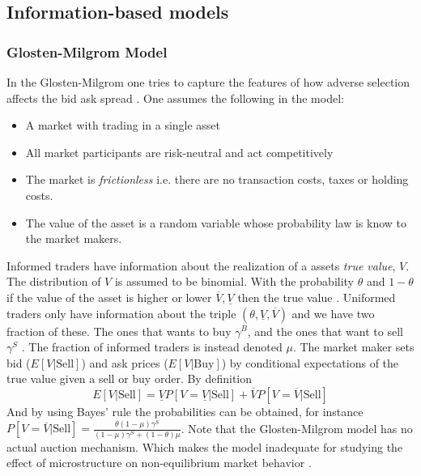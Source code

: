 \documentclass{kththesis}
\theoremstyle{definition}
\begin{document}
\subsection{Information-based models}

\subsubsection*{Glosten-Milgrom Model}
In the Glosten-Milgrom one tries to capture the features of how adverse selection affects the bid ask spread \parencite{darley2007nasdaq}. One assumes the following in the model:
\begin{itemize}
    \item A market with trading in a single asset
    \item All market participants are risk-neutral and act competitively
    \item The market is \textit{frictionless} i.e. there are no transaction costs, taxes or holding costs.
    \item The value of the asset is a random variable whose probability law is know to the market makers.
\end{itemize}
Informed traders have information about the realization of a assets \textit{true value}, $V$. The distribution of $V$ is assumed to be binomial. With the probability $\theta$ and $1- \theta$ if the value of the asset is higher or lower $\overline{V}, \underline{V}$  then the true value \parencite{darley2007nasdaq}. Uniformed traders only have information about the triple $(\theta, \underline{V}, \overline{V})$ and we have two fraction of these. The ones that wants to buy $\gamma^{B}$, and the ones that want to sell $\gamma^{S}$ \parencite{darley2007nasdaq}. The fraction of informed traders is instead denoted $\mu$. The market maker sets bid ($E[V|\text{Sell}]$) and ask prices ($E[V|\text{Buy}]$) by conditional expectations of the true value given a sell or buy order. By definition \parencite{darley2007nasdaq} 
\begin{equation}
    \label{eq:7}
    E[V|\text{Sell}] = \underline{V}P[V=\underline{V}|\text{Sell}] + \overline{V}P[V=\overline{V}|\text{Sell}]
\end{equation}
And by using Bayes' rule the probabilities  can be obtained, for instance $P[V=\overline{V}|\text{Sell}] = \frac{\theta(1-\mu)\gamma^{S}}{(1-\mu)\gamma^{S} + (1-\theta)\mu}$.
Note that the Glosten-Milgrom model has no actual auction mechanism. Which makes the model inadequate for studying the effect of microstructure on non-equilibrium market behavior \parencite{darley2007nasdaq}.
\end{document}

